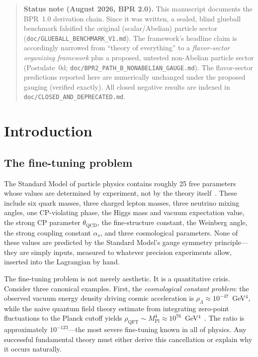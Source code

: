 \documentclass[aps,prd,twocolumn,superscriptaddress,longbibliography,nofootinbib]{revtex4-2}
\begin{document}
\begin{quote}
\textbf{Status note (August 2026, BPR 2.0).}  This manuscript
documents the BPR~1.0 derivation chain.  Since it was written, a
sealed, blind glueball benchmark falsified the original
(scalar/Abelian) particle sector
(\texttt{doc/GLUEBALL\_BENCHMARK\_V1.md}).  The framework's headline
claim is accordingly narrowed from ``theory of everything'' to a
\emph{flavor-sector organizing framework} plus a proposed, untested
non-Abelian particle sector (Postulate~0d;
\texttt{doc/BPR2\_PATH\_B\_NONABELIAN\_GAUGE.md}).  The flavor-sector
predictions reported here are numerically unchanged under the
proposed gauging (verified exactly).  All closed negative results are
indexed in \texttt{doc/CLOSED\_AND\_DEPRECATED.md}.
\end{quote}


\section{Introduction}
\label{sec:intro}

\subsection{The fine-tuning problem}

The Standard Model of particle physics contains roughly 25 free
parameters whose values are determined by experiment, not by the
theory itself~\cite{PDG2024}.  These include six quark masses, three
charged lepton masses, three neutrino mixing angles, one CP-violating
phase, the Higgs mass and vacuum expectation value, the strong CP
parameter $\theta_{\mathrm{QCD}}$, the fine-structure constant, the
Weinberg angle, the strong coupling constant $\alpha_s$, and three
cosmological parameters.  None of these values are predicted by the
Standard Model's gauge symmetry principle---they are simply inputs,
measured to whatever precision experiments allow, inserted into the
Lagrangian by hand.

The fine-tuning problem is not merely aesthetic.  It is a quantitative
crisis.  Consider three canonical examples.  First, the
\textit{cosmological constant problem}: the observed vacuum energy
density driving cosmic acceleration is $\rho_\Lambda \approx
10^{-47}$~GeV$^4$, while the naive quantum field theory estimate
from integrating zero-point fluctuations to the Planck cutoff yields
$\rho_{\mathrm{QFT}} \sim M_{\mathrm{Pl}}^4 \approx
10^{76}$~GeV$^4$~\cite{Weinberg1989}.  The ratio is approximately
$10^{-123}$---the most severe fine-tuning known in all of physics.
Any successful fundamental theory must either derive this cancellation
or explain why it occurs naturally.
\end{document}
